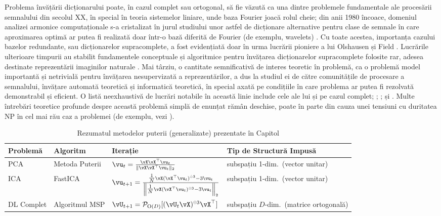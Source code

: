 \documentclass[../../book-main_ro.tex]{subfiles}
\begin{document}
Problema
învățării dicționarului poate, în cazul complet sau ortogonal, să fie văzută ca una dintre
problemele fundamentale ale procesării semnalului din secolul XX, în special
în teoria sistemelor liniare, unde baza Fourier joacă rolul cheie; din
anii 1980 încoace, domeniul analizei armonice computaționale s-a cristalizat în jurul
studiului unor astfel de dicționare alternative pentru clase de semnale în care aproximarea
optimă ar putea fi realizată doar într-o bază diferită de Fourier (de exemplu, wavelets)
\cite{Donoho1998-zf}. Cu toate acestea, importanța cazului bazelor redundante, sau
dicționarelor supracomplete, a fost evidențiată doar în urma lucrării pioniere a lui
Olshausen și Field \cite{Olshausen1996-ap,Olshausen1997-yv}. Lucrările ulterioare timpurii au
stabilit fundamentele conceptuale și algoritmice pentru învățarea
dicționarelor supracomplete folosite rar, adesea destinate reprezentării imaginilor
naturale
\cite{Donoho2001-tl,DonohoD2003-PNAS,Elad2006-yi,Murray2007-cw,aharon2006k,Mairal2014-nq,Gribonval2015-fy}.
Mai târziu, o cantitate semnificativă de interes teoretic în problemă, ca o problemă
model importantă și netrivială pentru învățarea nesupervizată a reprezentărilor,
a dus la studiul ei de către comunitățile de procesare a semnalului, învățare automată teoretică și
informatică teoretică, în special axată pe condițiile
în care problema ar putea fi rezolvată demonstrabil și eficient.
O listă neexhaustivă de lucrări notabile în această linie include cele ale lui
\textcite{Spielman2012-tl} și \textcite{sun2017complete_a} pe cazul complet;
\textcite{pmlr-v40-Arora15}; \textcite{Barak2015-uu}; și
\textcite{Qu2020Geometric}. Multe întrebări teoretice profunde despre această
problemă simplă de enunțat rămân deschise, poate în parte din cauza unei tensiuni cu
duritatea NP în cel mai rău caz a problemei (de exemplu, vezi \textcite{Tillmann2015-up}).

\begin{table}[tb]
\centering
    \caption{Rezumatul metodelor puterii (generalizate) prezentate în Capitol}
    \label{tab:power-method-summary}
\begin{tabular}{llll}
\toprule
Problemă & Algoritm & Iterație & Tip de Structură Impusă \\
\midrule
PCA & Metoda Puterii & $\vu_{t} = \frac{\vX\vX^\top
    \vu_{t}}{\norm{\vX\vX^\top \vu_{t}}_2}$ & subspațiu 1-dim.\ (vector unitar) \\
    \addlinespace
    ICA & FastICA &
    $\vu_{t+1} = \frac{\tfrac{1}{N}\vX (\vX^\top \vu_{t})^{\hada 3}-
    3 \vu_{t}}{\norm*{\tfrac{1}{N}\vX (\vX^\top \vu_{t})^{\hada 3}-
    3 \vu_{t}}_2}$
    & subspațiu 1-dim.\ (vector unitar) \\
    \addlinespace
    DL Complet & Algoritmul MSP &
    $\vU_{t+1} = \mathcal{P}_{\mathrm O(D)}[( {\vU_t \vX})^{\hada 3}\vX^\top]$
    & subspațiu $D$-dim.\ (matrice ortogonală) \\
\bottomrule
\end{tabular}
\end{table}
\end{document}
